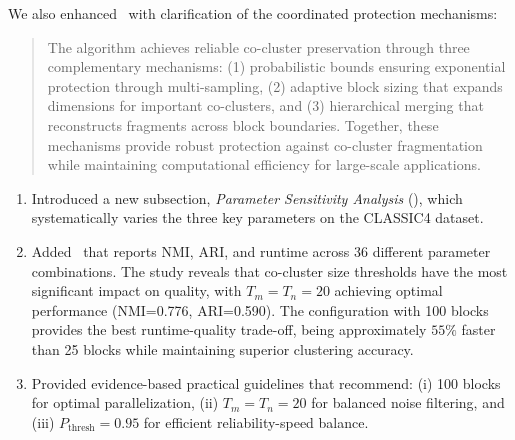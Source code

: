 \documentclass{ar2rc}
\theoremstyle{definition}
\theoremstyle{remark} %
\begin{document}
We also enhanced~ with clarification of the coordinated protection mechanisms:

\begin{quote}
  The algorithm achieves reliable co-cluster preservation through three complementary mechanisms: (1) probabilistic bounds ensuring exponential protection through multi-sampling, (2) adaptive block sizing that expands dimensions for important co-clusters, and (3) hierarchical merging that reconstructs fragments across block boundaries. Together, these mechanisms provide robust protection against co-cluster fragmentation while maintaining computational efficiency for large-scale applications.
\end{quote}


\begin{enumerate}
  \item Introduced a new subsection, \emph{Parameter Sensitivity Analysis} (), which systematically varies the three key parameters on the CLASSIC4 dataset.
  \item Added~ that reports NMI, ARI, and runtime across 36 different parameter combinations. The study reveals that co-cluster size thresholds have the most significant impact on quality, with $T_m=T_n=20$ achieving optimal performance (NMI=0.776, ARI=0.590). The configuration with 100 blocks provides the best runtime-quality trade-off, being approximately $55\%$ faster than 25 blocks while maintaining superior clustering accuracy.
  \item Provided evidence-based practical guidelines that recommend: (i) 100 blocks for optimal parallelization, (ii) $T_m=T_n=20$ for balanced noise filtering, and (iii) $P_{\text{thresh}}=0.95$ for efficient reliability-speed balance.
\end{enumerate}
\end{document}
